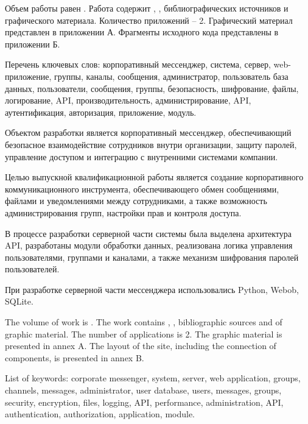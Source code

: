 
\setlength{\parindent}{1.25cm}

Объем работы равен . Работа содержит , ,  библиографических источников и  графического материала. Количество приложений – 2. Графический материал представлен в приложении А. Фрагменты исходного кода представлены в приложении Б.

Перечень ключевых слов: корпоративный мессенджер, система, сервер, web-приложение, группы, каналы, сообщения, администратор, пользователь база данных, пользователи, сообщения, группы, безопасность, шифрование, файлы, логирование, API, производительность, администрирование, API, аутентификация, авторизация, приложение, модуль.

Объектом разработки является корпоративный мессенджер, обеспечивающий безопасное взаимодействие сотрудников внутри организации, защиту паролей, управление доступом и интеграцию с внутренними системами компании.

Целью выпускной квалификационной работы является создание корпоративного коммуникационного инструмента, обеспечивающего обмен сообщениями, файлами и уведомлениями между сотрудниками, а также возможность администрирования групп, настройки прав и контроля доступа.

В процессе разработки серверной части системы была выделена архитектура API, разработаны модули обработки данных, реализована логика управления пользователями, группами и каналами, а также механизм шифрования паролей пользователей.

При разработке серверной части мессенджера использовались Python, Webob, SQLite.

  
The volume of work is . The work contains , ,  bibliographic sources and  of graphic material. The number of applications is 2. The graphic material is presented in annex A. The layout of the site, including the connection of components, is presented in annex B.

List of keywords: corporate messenger, system, server, web application, groups, channels, messages, administrator, user database, users, messages, groups, security, encryption, files, logging, API, performance, administration, API, authentication, authorization, application, module.

